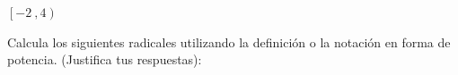 \documentclass[addpoints,spanish, 12pt,a4paper]{exam}
\begin{document}
\begin{questions}
\begin{solution}
$\left[-2 \ , 4\right)$ 
\end{solution}

\question Calcula los siguientes radicales utilizando la definición o la notación en forma de potencia. (Justifica tus respuestas):

\addpoints


\end{questions}
\end{document}
